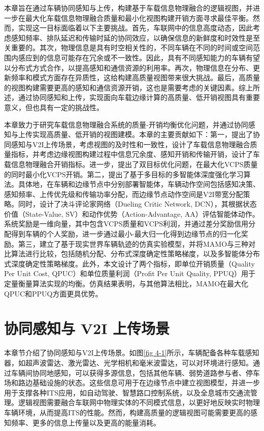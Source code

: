 本章旨在通过车辆协同感知与上传，构建基于车载信息物理融合的逻辑视图，并进一步在最大化车载信息物理融合质量和最小化视图构建开销方面寻求最佳平衡。然而，实现这一目标面临着以下主要挑战。首先，车联网中的信息高度动态，因此考虑感知频率、排队延迟和传输时延的协同效应，以确保信息的新鲜度和时效性是至关重要的。其次，物理信息是具有时空相关性的，不同车辆在不同的时间或空间范围内感应到的信息可能存在冗余或不一致性。因此，具有不同感知能力的车辆有望以分布式方式合作，以提高感知和通信资源的利用率。再次，物理信息在分布、更新频率和模式方面存在异质性，这给构建高质量视图带来很大挑战。最后，高质量的视图构建需要更高的感知和通信资源开销，这也是需要考虑的关键因素。综上所述，通过协同感知和上传，实现面向车载边缘计算的高质量、低开销视图具有重要意义，但也具有一定的挑战性。

本章致力于研究车载信息物理融合系统的质量-开销均衡优化问题，并通过协同感知与上传实现高质量、低开销的视图建模。本章的主要贡献如下：第一，提出了协同感知与V2I上传场景，考虑视图的及时性和一致性，设计了车载信息物理融合质量指标，并考虑边缘视图构建过程中信息冗余度、感知开销和传输开销，设计了车载信息物理融合开销指标。进一步，提出了双目标优化问题，在最大化VCPS质量的同时最小化VCPS开销。第二，提出了基于多目标的多智能体深度强化学习算法。具体地，在车辆和边缘节点中分别部署智能体，车辆动作空间包括感知决策、感知频率、上传优先级和传输功率分配，而边缘节点动作空间是V2I带宽分配策略。同时，设计了决斗评论家网络（Dueling Critic Network, DCN），其根据状态价值（State-Value, SV）和动作优势（Action-Advantage, AA）评估智能体动作。系统奖励是一维向量，其中包含VCPS质量和VCPS利润，并通过差分奖励信用分配得到车辆的个人奖励，进一步通过最小-最大归一化得到边缘节点的归一化奖励。第三，建立了基于现实世界车辆轨迹的仿真实验模型，并将MAMO与三种对比算法进行比较，包括随机分配、分布式深度确定性策略梯度\cite{barth2018distributed}，以及多智能体分布式深度确定性策略梯度。此外，本文设计了两个指标，即单位开销质量（Quality Per Unit Cost, QPUC）和单位质量利润（Proﬁt Per Unit Quality, PPUQ）用于定量衡量算法实现的均衡。仿真结果表明，与其他算法相比，MAMO在最大化QPUC和PPUQ方面更具优势。

\section[\hspace{-2pt}协同感知与 V2I 上传场景]{{ \hspace{-8pt}协同感知与 V2I 上传场景}}\label{section 4-2}

本章节介绍了协同感知与V2I上传场景。如图\ref{fig 4-1}所示，车辆配备各种车载感知器，如超声波雷达、激光雷达、光学相机和毫米波雷达，可以对环境进行感知。通过车辆间协同地感知，可以获得多源信息，包括其他车辆、弱势道路参与者、停车场和路边基础设施的状态。这些信息可用于在边缘节点中建立视图模型，并进一步用于支撑各种ITS应用，如自动驾驶\cite{bai2022hybrid}、智慧路口控制系统\cite{hadjigeorgious2023real}，以及全息城市交通流管理\cite{wang2023city}。逻辑视图需要融合车联网中物理实体的不同模式信息，以更好地反映实时物理车辆环境，从而提高ITS的性能。然而，构建高质量的逻辑视图可能需要更高的感知频率、更多的信息上传量以及更高的能量消耗。

